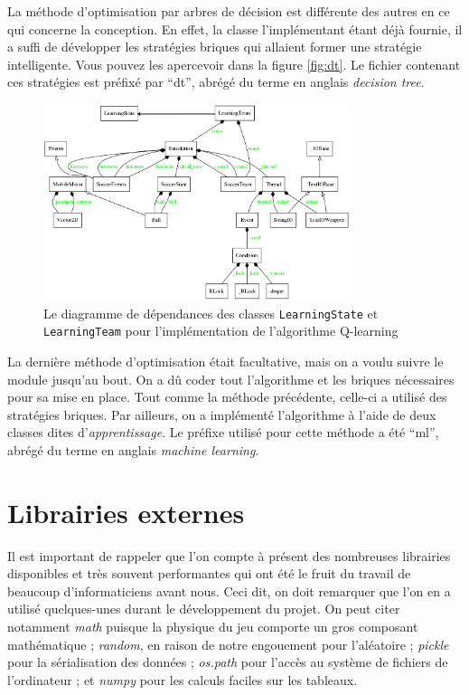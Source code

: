 \documentclass[12pt,a4paper]{article}
\begin{document}
La m\'ethode d'optimisation par arbres de d\'ecision est diff\'erente des 
autres en ce qui concerne la conception. En effet, la classe l'impl\'ementant 
\'etant d\'ej\`a fournie, il a suffi de d\'evelopper les strat\'egies briques 
qui allaient former une strat\'egie intelligente. Vous pouvez les apercevoir 
dans la figure \ref{fig:dt}. Le fichier contenant ces strat\'egies est 
pr\'efix\'e par \enquote{dt}, abr\'eg\'e du terme en anglais {\itshape 
decision tree}.

\begin{figure}[!h]
  \centering
  \captionsetup{justification=centering}
  \includegraphics[width=0.8\textwidth]{machineLearning_mod}
  \caption[Les classes pour l'apprentissage automatique]{Le diagramme de 
d\'ependances des classes \texttt{LearningState} et \texttt{LearningTeam} pour 
l'impl\'ementation de l'algorithme Q-learning}
  \label{fig:ml}
\end{figure}

La derni\`ere m\'ethode d'optimisation \'etait facultative, mais on a voulu 
suivre le module jusqu'au bout. On a d\^u coder tout l'algorithme et les 
briques n\'ecessaires pour sa mise en place. Tout comme la m\'ethode 
pr\'ec\'edente, celle-ci a utilis\'e des strat\'egies briques. Par ailleurs, on 
a impl\'ement\'e l'algorithme \`a l'aide de deux classes dites 
d'{\itshape apprentissage}.
Le pr\'efixe utilis\'e pour cette m\'ethode a \'et\'e \enquote{ml}, abr\'eg\'e 
du terme en anglais {\itshape machine learning}.

\section{Librairies externes}
Il est important de rappeler que l'on compte \`a pr\'esent des nombreuses 
librairies disponibles et tr\`es souvent performantes qui ont \'et\'e le fruit 
du travail de beaucoup d'informaticiens avant nous. Ceci dit, on doit remarquer 
que l'on en a utilis\'e quelques-unes durant le d\'eveloppement du projet. On 
peut citer notamment {\itshape math} puisque la physique du jeu comporte un 
gros composant math\'ematique ; {\itshape random}, en raison de notre 
engouement pour l'al\'eatoire ; {\itshape pickle} pour la s\'erialisation des 
donn\'ees ; {\itshape os.path} pour l'acc\`es au syst\`eme de fichiers de 
l'ordinateur ; et {\itshape numpy} pour les calculs faciles sur les tableaux.
\end{document}
